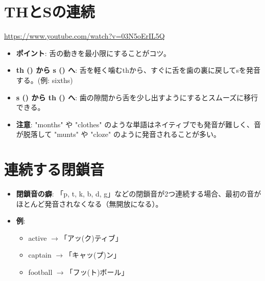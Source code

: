 \documentclass{jlreq}
\begin{document}
\section{THとSの連続}
\href{https://www.youtube.com/watch?v=03N5oErIL5Q}{https://www.youtube.com/watch?v=03N5oErIL5Q}
\begin{itemize}
    \item \textbf{ポイント}: 舌の動きを最小限にすることがコツ。
    \item \textbf{th (\textipa{[\texttheta]}) から s (\textipa{[s]}) へ}: 舌を軽く噛むthから、すぐに舌を歯の裏に戻してsを発音する。(例: sixths)
    \item \textbf{s (\textipa{[s]}) から th (\textipa{[\texttheta]}) へ}: 歯の隙間から舌を少し出すようにするとスムーズに移行できる。
    \item \textbf{注意}: "months" や "clothes" のような単語はネイティブでも発音が難しく、音が脱落して "munts" や "cloze" のように発音されることが多い。
\end{itemize}

\section{連続する閉鎖音}
\begin{itemize}
    \item \textbf{閉鎖音の癖}: 「p, t, k, b, d, g」などの閉鎖音が2つ連続する場合、最初の音がほとんど発音されなくなる（無開放になる）。
    \item \textbf{例}:
        \begin{itemize}
            \item active $\to$「アッ(ク)ティブ」
            \item captain $\to$「キャッ(プ)ン」
            \item football $\to$「フッ(ト)ボール」
        \end{itemize}
\end{itemize}
\end{document}
